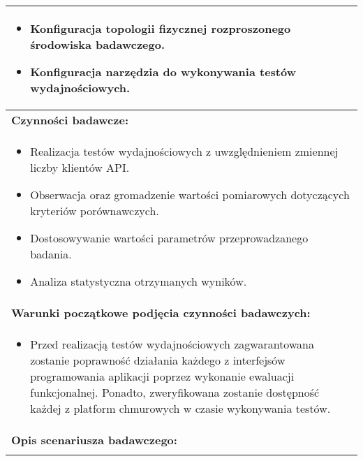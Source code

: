 \begin{longtable}[c]{|llll|}
{\begin{itemize}
            \item Konfiguracja topologii fizycznej rozproszonego środowiska badawczego.
            \item Konfiguracja narzędzia do wykonywania testów wydajnościowych.
        \end{itemize}}                                                           \\ \hline
    \multicolumn{4}{|l|}{\textbf{Czynności badawcze:}}                               \\ \hline
    \multicolumn{4}{|p{\linewidth}|}{
        \begin{itemize}
            \item Realizacja testów wydajnościowych z uwzględnieniem zmiennej liczby klientów API.
            \item Obserwacja oraz gromadzenie wartości pomiarowych dotyczących kryteriów porównawczych.
            \item Dostosowywanie wartości parametrów przeprowadzanego badania.
            \item Analiza statystyczna otrzymanych wyników.
        \end{itemize}
    }                                                           \\ \hline
    \multicolumn{4}{|l|}{\textbf{Warunki początkowe podjęcia czynności badawczych:}} \\ \hline
    \multicolumn{4}{|p{\linewidth}|}{
        \begin{itemize}[label={}]
            \item Przed realizacją testów wydajnościowych zagwarantowana zostanie poprawność działania każdego z interfejsów programowania aplikacji poprzez wykonanie ewaluacji funkcjonalnej. Ponadto, zweryfikowana zostanie dostępność każdej z platform chmurowych w czasie wykonywania testów.  
          \end{itemize}
    }                                                           \\ \hline
    \multicolumn{4}{|l|}{\textbf{Opis scenariusza badawczego:}}                      \\ \hline
    \multicolumn{4}{|p{\linewidth}|}{
        \begin{itemize}[label={}]

\end{itemize}}
\end{longtable}
